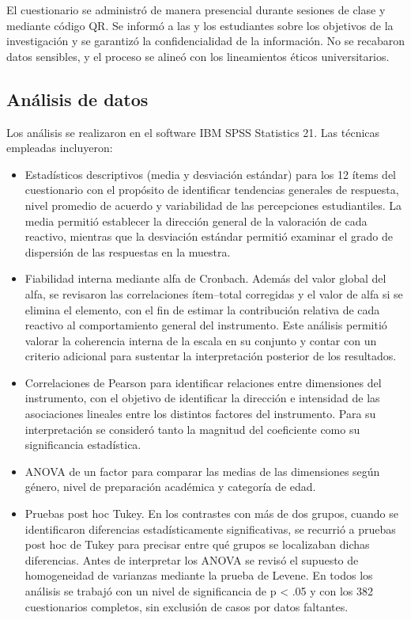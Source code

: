 \documentclass[spanish]{textolivre}
\begin{document}
El cuestionario se administró de manera presencial durante sesiones de clase y mediante código QR. Se informó a las y los estudiantes sobre los objetivos de la investigación y se garantizó la confidencialidad de la información. No se recabaron datos sensibles, y el proceso se alineó con los lineamientos éticos universitarios.

\subsection{Análisis de datos}

Los análisis se realizaron en el software IBM SPSS Statistics 21. Las técnicas empleadas incluyeron:
\begin{itemize}
    \item Estadísticos descriptivos (media y desviación estándar) para los 12 ítems del cuestionario con el propósito de identificar tendencias generales de respuesta, nivel promedio de acuerdo y variabilidad de las percepciones estudiantiles. La media permitió establecer la dirección general de la valoración de cada reactivo, mientras que la desviación estándar permitió examinar el grado de dispersión de las respuestas en la muestra.
    \item Fiabilidad interna mediante alfa de Cronbach. Además del valor global del alfa, se revisaron las correlaciones ítem–total corregidas y el valor de alfa si se elimina el elemento, con el fin de estimar la contribución relativa de cada reactivo al comportamiento general del instrumento. Este análisis permitió valorar la coherencia interna de la escala en su conjunto y contar con un criterio adicional para sustentar la interpretación posterior de los resultados.
    \item Correlaciones de Pearson para identificar relaciones entre dimensiones del instrumento, con el objetivo de identificar la dirección e intensidad de las asociaciones lineales entre los distintos factores del instrumento. Para su interpretación se consideró tanto la magnitud del coeficiente como su significancia estadística.
    \item ANOVA de un factor para comparar las medias de las dimensiones según género, nivel de preparación académica y categoría de edad. 
    \item Pruebas post hoc Tukey. En los contrastes con más de dos grupos, cuando se identificaron diferencias estadísticamente significativas, se recurrió a pruebas post hoc de Tukey para precisar entre qué grupos se localizaban dichas diferencias. Antes de interpretar los ANOVA se revisó el supuesto de homogeneidad de varianzas mediante la prueba de Levene. En todos los análisis se trabajó con un nivel de significancia de p < .05 y con los 382 cuestionarios completos, sin exclusión de casos por datos faltantes.
\end{itemize}
\end{document}
